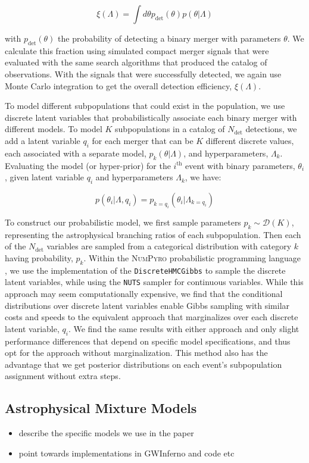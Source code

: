 \begin{equation} \label{eq:detfrac}
    \xi(\Lambda) = \int d\theta p_\mathrm{det}(\theta) p(\theta | \Lambda)
\end{equation}

\noindent with $p_\mathrm{det}(\theta)$ the probability of detecting a binary merger with parameters $\theta$. We calculate this fraction using simulated compact merger signals that were evaluated with the same search algorithms that produced the catalog of observations. With the signals that were successfully detected, we again use Monte Carlo integration to get the overall detection efficiency, $\xi(\Lambda)$.


To model different subpopulations that could exist in the population, we use discrete latent variables that probabilistically associate each binary merger with different models. To model $K$ subpopulations in a catalog of $N_\mathrm{det}$ detections, we add a latent variable $q_i$ for each merger that can be $K$ different discrete values, each associated with a separate model, $p_{k}(\theta | \Lambda)$, and hyperparameters, $\Lambda_k$. Evaluating the model (or hyper-prior) for the $i^\mathrm{th}$ event with binary parameters, $\theta_i$, given latent variable $q_i$ and hyperparameters $\Lambda_k$, we have:

\begin{equation} \label{eq:latent}
    p(\theta_i | \Lambda, q_i) = p_{k=q_i}(\theta_i | \Lambda_{k=q_i})
\end{equation}

\noindent To construct our probabilistic model, we first sample parameters $p_k \sim \mathcal{D}(K)$, representing the astrophysical branching ratios of each subpopulation. Then each of the $N_\mathrm{det}$ variables are sampled from a categorical distribution with category $k$ having probability, $p_k$. Within the \textsc{NumPyro} \citep{1810.09538,1912.11554} probabilistic programming language \citep{1912.11554}, we use the implementation of the \texttt{DiscreteHMCGibbs} \citep{Liu1996PeskunsTA} to sample the discrete latent variables, while using the \texttt{NUTS} \citep{1111.4246} sampler for continuous variables. While this approach may seem computationally expensive, we find that the conditional distributions over discrete latent variables enable Gibbs sampling with similar costs and speeds to the equivalent approach that marginalizes over each discrete latent variable, $q_i$. We find the same results with either approach and only slight performance differences that depend on specific model specifications, and thus opt for the approach without marginalization. This method also has the advantage that we get posterior distributions on each event's subpopulation assignment without extra steps.

\subsection{Astrophysical Mixture Models} \label{sec:astromodels}

\begin{itemize}
    \item describe the specific models we use in the paper
    \item point towards implementations in GWInferno and code etc
\end{itemize}